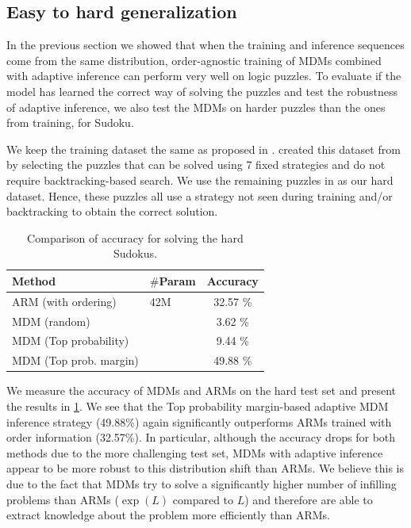 \documentclass{article}
\theoremstyle{plain}
\theoremstyle{definition}
\theoremstyle{remark}
\begin{document}
\subsection{Easy to hard generalization}

In the previous section we showed that when the training and inference sequences come from the same distribution, order-agnostic training of MDMs combined with adaptive inference can perform very well on logic puzzles. To evaluate if the model has learned the correct way of solving the puzzles and test the robustness of adaptive inference, we also test the MDMs on harder puzzles than the ones from training, for Sudoku. 

We keep the training dataset the same as proposed in \citet{shah2024causal}. \citet{shah2024causal} created this dataset from \citet{david_g__radcliffe_2020} by selecting the puzzles that can be solved using 7 fixed strategies and do not require backtracking-based search. We use the remaining puzzles in \citet{david_g__radcliffe_2020} as our hard dataset. Hence, these puzzles all use a strategy not seen during training and/or backtracking to obtain the correct solution.  

\begin{table}[t]
    \centering
    \caption{Comparison of accuracy for solving the hard Sudokus.}
    \vspace{0.1in}
    \begin{tabular}{l >{\centering\arraybackslash}p{1.4cm} c}
    \toprule
        \textbf{Method} & \textbf{$\#$Param} & \textbf{Accuracy} \\
        \midrule
         ARM (with ordering) & 42M & 32.57 \% \\
         \midrule
         MDM (random) & \multirow{3}{*}{6M} & 3.62 \% \\
         MDM (Top probability) & & 9.44 \% \\
         MDM (Top prob. margin) &  & 49.88 \% \\
         \bottomrule
    \end{tabular}
    \label{tab:easy-to-hard-sudoku}
\end{table}


We measure the accuracy of MDMs and ARMs on the hard test set and present the results in \cref{tab:easy-to-hard-sudoku}. We see that the Top probability margin-based adaptive MDM inference strategy (49.88\%) again significantly outperforms ARMs trained with order information (32.57\%). In particular, although the accuracy drops for both methods due to the more challenging test set, MDMs with adaptive inference appear to be more robust to this distribution shift than ARMs. We believe this is due to the fact that MDMs try to solve a significantly higher number of infilling problems than ARMs ($\exp(L)$ compared to $L$) and therefore are able to extract knowledge about the problem more efficiently than ARMs. 
\end{document}
